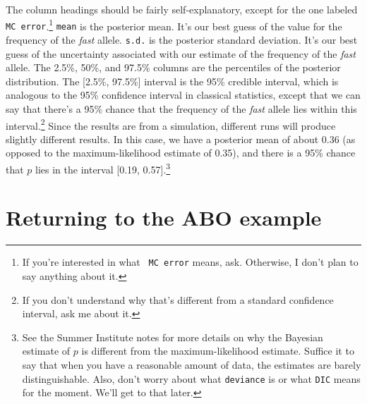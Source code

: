 The column headings should be fairly self-explanatory, except for the
one labeled {\tt MC error}.\footnote{If you're interested in what {\tt
    MC error} means, ask. Otherwise, I don't plan to say anything
  about it.} {\tt mean} is the posterior mean. It's our best guess of
the value for the frequency of the {\it fast\/} allele. {\tt s.d.} is
the posterior standard deviation. It's our best guess of the
uncertainty associated with our estimate of the frequency of the {\it
  fast\/} allele. The 2.5\%, 50\%, and 97.5\% columns are the
percentiles of the posterior distribution. The [2.5\%, 97.5\%]
interval is the 95\% credible interval, which is analogous to the 95\%
confidence interval in classical statistics, except that we can say
that there's a 95\% chance that the frequency of the {\it fast\/}
allele lies within this interval.\footnote{If you don't understand why
  that's different from a standard confidence interval, ask me about
  it.} Since the results are from a simulation, different runs will
produce slightly different results. In this case, we have a posterior
mean of about 0.36 (as opposed to the maximum-likelihood estimate of
0.35), and there is a 95\% chance that $p$ lies in the interval [0.19,
0.57].\footnote{See the Summer Institute notes for more details on why
  the Bayesian estimate of $p$ is different from the
  maximum-likelihood estimate. Suffice it to say that when you have a
  reasonable amount of data, the estimates are barely
  distinguishable. Also, don't worry about what {\tt deviance\/} is or
what {\tt DIC\/} means for the moment. We'll get to that later.}

\section*{Returning to the ABO example}

